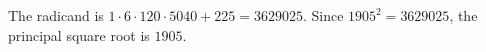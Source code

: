 The radicand is $1\cdot6\cdot120\cdot5040+225=3629025$. Since $1905^2=3629025$, the principal square root is $\boxed{1905}$.

